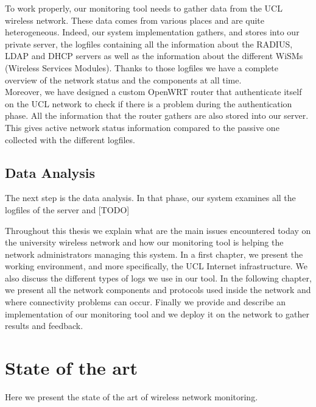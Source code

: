 To work properly, our monitoring tool needs to gather data from the UCL wireless network. These data comes from various places and are quite heterogeneous. Indeed, our system implementation gathers, and stores into our private server, the logfiles containing all the information about the RADIUS, LDAP and DHCP servers as well as the information about the different WiSMs (Wireless Services Modules). Thanks to those logfiles we have a complete overview of the network status and the components at all time.\\

Moreover, we have designed a custom OpenWRT router that authenticate itself on the UCL network to check if there is a problem during the authentication phase. All the information that the router gathers are also stored into our server. This gives active network status information compared to the passive one collected with the different logfiles.


\subsection{Data Analysis}
The next step is the data analysis. In that phase, our system examines all the logfiles of the server and [TODO]




Throughout this thesis we explain what are the main issues encountered today on the university wireless network and how our monitoring tool is helping the network administrators managing this system. In a first chapter, we present the working environment, and more specifically, the UCL Internet infrastructure. We also discuss the different types of logs we use in our tool. In the following chapter, we present all the network components and protocols used inside the network and where connectivity problems can occur. Finally we provide and describe an implementation of our monitoring tool and we deploy it on the network to gather results and feedback.


\section{State of the art}
Here we present the state of the art of wireless network monitoring.